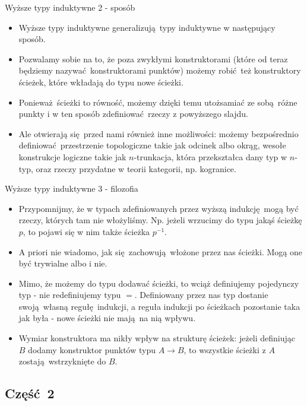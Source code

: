 \documentclass{beamer}
\begin{document}
\begin{frame}{Wyższe typy induktywne 2 - sposób}
\begin{itemize}
	\item Wyższe typy induktywne generalizują typy induktywne w następujący sposób.
	\item Pozwalamy sobie na to, że poza zwykłymi konstruktorami (które od teraz będziemy nazywać konstruktorami punktów) możemy robić też konstruktory ścieżek, które wkładają do typu nowe ścieżki.
	\item Ponieważ ścieżki to równość, możemy dzięki temu utożsamiać ze sobą różne punkty i w ten sposób zdefiniować rzeczy z powyższego slajdu.
	\item Ale otwierają się przed nami również inne możliwości: możemy bezpośrednio definiować przestrzenie topologiczne takie jak odcinek albo okrąg, wesołe konstrukcje logiczne takie jak $n$-trunkacja, która przekształca dany typ w $n$-typ, oraz rzeczy przydatne w teorii kategorii, np. kogranice.
\end{itemize}
\end{frame}

\begin{frame}{Wyższe typy induktywne 3 - filozofia}
\begin{itemize}
	\item Przypomnijmy, że w typach zdefiniowanych przez wyższą indukcję mogą być rzeczy, których tam nie włożyliśmy. Np. jeżeli wrzucimy do typu jakąś ścieżkę $p$, to pojawi się w nim także ścieżka $p^{-1}$.
	\item A priori nie wiadomo, jak się zachowują włożone przez nas ścieżki. Mogą one być trywialne albo i nie.
	\item Mimo, że możemy do typu dodawać ścieżki, to wciąż definiujemy pojedynczy typ - nie redefiniujemy typu $=$. Definiowany przez nas typ dostanie swoją własną regułę indukcji, a reguła indukcji po ścieżkach pozostanie taka jak była - nowe ścieżki nie mają na nią wpływu.
	\item Wymiar konstruktora ma nikły wpływ na strukturę ścieżek: jeżeli definiując $B$ dodamy konstruktor punktów typu $A \to B$, to wszystkie ścieżki z $A$ zostają wstrzyknięte do $B$.
\end{itemize}
\end{frame}

\subsection{Część 2}
\end{document}

